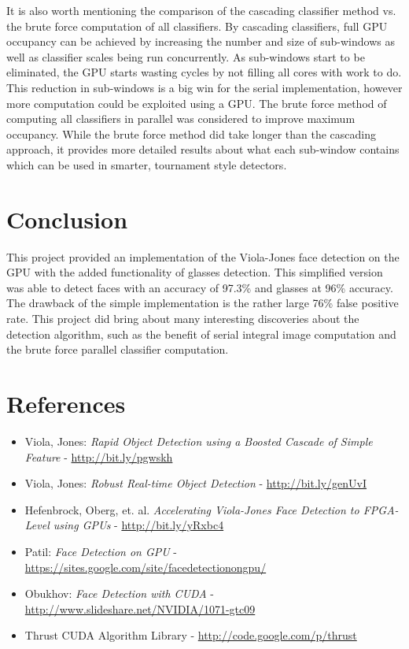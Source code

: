 \documentclass[12pt] {article}
\begin{document}
It is also worth mentioning the comparison of the cascading classifier method vs. the brute force computation of all classifiers. By cascading classifiers, full GPU occupancy can be achieved by increasing the number and size of sub-windows as well as classifier scales being run concurrently. As sub-windows start to be eliminated, the GPU starts wasting cycles by not filling all cores with work to do. This reduction in sub-windows is a big win for the serial implementation, however more computation could be exploited using a GPU. The brute force method of computing all classifiers in parallel was considered to improve maximum occupancy. While the brute force method did take longer than the cascading approach, it provides more detailed results about what each sub-window contains which can be used in smarter, tournament style detectors. 

\section{Conclusion}
This project provided an implementation of the Viola-Jones face detection on the GPU with the added functionality of glasses detection. This simplified version was able to detect faces with an accuracy of 97.3\% and glasses at 96\% accuracy. The drawback of the simple implementation is the rather large 76\% false positive rate. This project did bring about many interesting discoveries about the detection algorithm, such as the benefit of serial integral image computation and the brute force parallel classifier computation.

\footnotesize
\section{References}

\begin{itemize}
	\item Viola, Jones: {\it Rapid Object Detection using a Boosted Cascade of Simple Feature} - \url {http://bit.ly/pgwskh}
	\item Viola, Jones: {\it Robust Real-time Object Detection} - \url {http://bit.ly/genUvI}
	\item Hefenbrock, Oberg, et. al. {\it Accelerating Viola-Jones Face Detection to FPGA-Level using GPUs} - \url {http://bit.ly/yRxbc4}
	\item Patil: {\it Face Detection on GPU} - \url {https://sites.google.com/site/facedetectionongpu/}
	\item Obukhov: {\it Face Detection with CUDA} - \url {http://www.slideshare.net/NVIDIA/1071-gtc09}
	\item Thrust CUDA Algorithm Library - \url {http://code.google.com/p/thrust}
\end{itemize}
\end{document}
